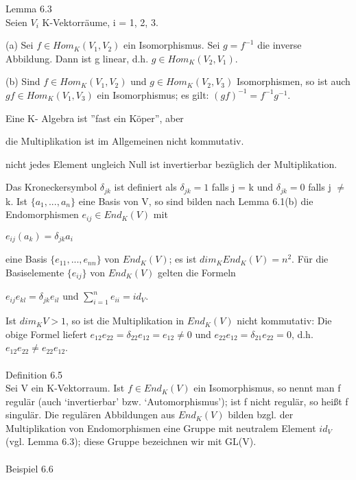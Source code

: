 Lemma 6.3\\
Seien $V_i$ K-Vektorräume, i = 1, 2, 3.
\begin{compactenum}
\item[(a)] Sei $f \in Hom_K(V_1,V_2)$ ein Isomorphismus. Sei $g = f^{-1}$ die inverse Abbildung. Dann ist g linear, d.h. $g \in Hom_K(V_2,V_1)$.
\item[(b)] Sind $f \in Hom_K(V_1,V_2)$ und $g \in Hom_K(V_2,V_3)$ Isomorphismen, so ist auch $gf \in Hom_K(V_1,V_3)$ ein Isomorphismus; es gilt: $(gf)^{-1} = f^{-1}g^{-1}$.
\end{compactenum}
Eine K- Algebra ist ”fast ein Köper”, aber
\begin{compactitem}
\item die Multiplikation ist im Allgemeinen nicht kommutativ.
\item nicht jedes Element ungleich Null ist invertierbar bezüglich der Multiplikation.\\
\end{compactitem}
Das Kroneckersymbol $\delta_{jk}$ ist definiert als $\delta_{jk} = 1$ falls j = k und $\delta_{jk} = 0$ falls j $\neq$ k. Ist $\{a_1,... ,a_n\}$ eine Basis von V, so sind bilden nach Lemma 6.1(b) die Endomorphismen $e_{ij} \in End_K (V)$ mit
\begin{center}
$e_{ij}(a_k) = \delta_{jk}a_i$
\end{center}
eine Basis $\{e_{11}, ..., e_{nn}\}$ von $End_K (V)$; es ist $dim_K End_K (V) = n^2$. Für die Basiselemente $\{e_{ij}\}$ von $End_K(V)$ gelten die Formeln
\begin{center}
$e_{ij}e_{kl} = \delta_{jk}e_{il}$ und $\sum\nolimits_{i=1}^{n}e_{ii} = id_V$.
\end{center}
Ist $dim_K V > 1$, so ist die Multiplikation in $End_K (V)$ nicht kommutativ: Die obige Formel liefert $e_{12}e_{22} = \delta_{22}e_{12} = e_{12} \neq 0$ und $e_{22}e_{12} = \delta_{21}e_{22} = 0$, d.h. $e_{12}e_{22} \neq e_{22}e_{12}$.\\
\\
Definition 6.5\\
Sei V ein K-Vektorraum. Ist $f \in End_K(V)$ ein Isomorphismus, so nennt man f regulär (auch ‘invertierbar’ bzw. ‘Automorphismus’); ist f nicht regulär, so heißt f singulär. Die regulären Abbildungen aus $End_K (V)$ bilden bzgl. der Multiplikation von Endomorphismen eine Gruppe mit neutralem Element $id_V$ (vgl. Lemma 6.3); diese Gruppe bezeichnen wir mit GL(V).\\
\\
Beispiel 6.6\\
